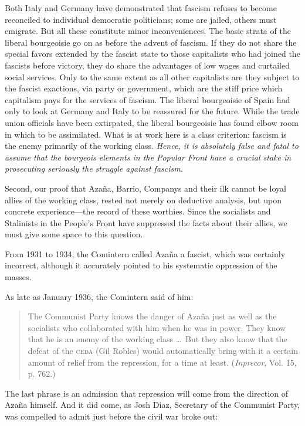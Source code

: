 Both Italy and Germany have demonstrated that fascism refuses to become reconciled to individual democratic politicians; some are jailed, others must emigrate. But all these constitute minor inconveniences. The basic strata of the liberal bourgeoisie go on as before the advent of fascism. If they do not share the special favors extended by the fascist state to those capitalists who had joined the fascists before victory, they do share the advantages of low wages and curtailed social services. Only to the same extent as all other capitalists are they subject to the fascist exactions, via party or government, which are the stiff price which capitalism pays for the services of fascism. The liberal bourgeoisie of Spain had only to look at Germany and Italy to be reassured for the future. While the trade union officials have been extirpated, the liberal bourgeoisie has found elbow room in which to be assimilated.
What is at work here is a class criterion: fascism is the enemy primarily of the working class. \emph{Hence, it is absolutely false and fatal to assume that the bourgeois elements in the Popular Front have a crucial stake in prosecuting seriously the struggle against fascism.}

Second, our proof that Azaña, Barrio, Companys and their ilk cannot be loyal allies of the working class, rested not merely on deductive analysis, but upon concrete experience---the record of these worthies. Since the socialists and Stalinists in the People’s Front have suppressed the facts about their allies, we must give some space to this question.

From 1931 to 1934, the Comintern called Azaña{\indexMAzana} a fascist, which was certainly incorrect, although it accurately pointed to his systematic oppression of the masses.

As late as January 1936, the Comintern said of him:

\begin{quotation}
  The Communist Party knows the danger of Azaña just as well as the socialists who collaborated with him when he was in power. They know that he is an enemy of the working class \dots\ But they also know that the defeat of the \textsc{ceda} (Gil Robles) would automatically bring with it a certain amount of relief from the repression, for a time at least. (\emph{Inprecor}, Vol. 15, p. 762.)
\end{quotation}

The last phrase is an admission that repression will come from the direction of Azaña himself. And it did come, as Josh Diaz, Secretary of the Communist Party, was compelled to admit just before the civil war broke out:

